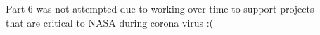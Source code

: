 Part 6 was not attempted due to working over time to support projects\\
that are critical to NASA during corona virus :(\\
